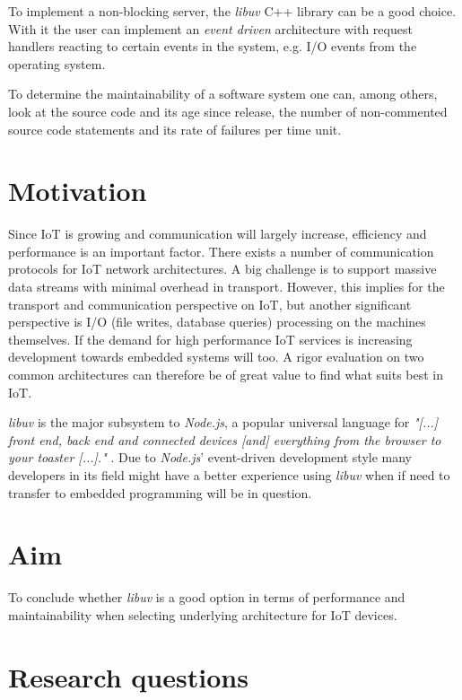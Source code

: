 To implement a non-blocking server, the \textit{libuv} C++ library can be a
good choice. With it the user can implement an \textit{event driven}
architecture with request handlers reacting to certain events in the system,
e.g. I/O events from the operating system. \cite{libuv-webpage}

To determine the maintainability of a software system one can, among others,
look at the source code and its age since release, the number of non-commented
source code statements and its rate of failures per time unit.
\cite{oman1992metrics}

\section{Motivation}
\label{sec:motivation}

Since IoT is growing and communication will largely increase, efficiency and
performance is an important factor. There exists a number of communication
protocols for IoT network architectures. A big challenge is to support massive
data streams with minimal overhead in transport. However, this implies for the
transport and communication perspective on IoT, but another significant
perspective is I/O (file writes, database queries) processing on the machines
themselves. If the demand for high performance IoT services is increasing
development towards embedded systems will too. A rigor evaluation on two common
architectures can therefore be of great value to find what suits best in IoT.

\textit{libuv} is the major subsystem to \textit{Node.js}, a popular universal
language for \textit{"[...] front end, back end and connected devices [and]
everything from the browser to your toaster [...]."}
\cite{node-js-survey-report-2016}. Due to \textit{Node.js}' event-driven
development style many developers in its field might have a better experience
using \textit{libuv} when if need to transfer to embedded programming will be
in question.

\section{Aim}
\label{sec:aim}

To conclude whether \textit{libuv} is a good option in terms of performance and
maintainability when selecting underlying architecture for IoT devices.

\section{Research questions}
\label{sec:research-questions}

